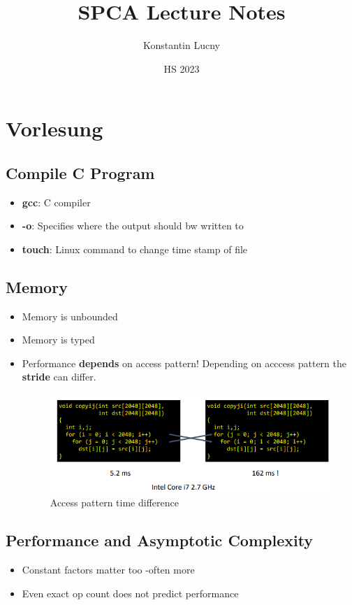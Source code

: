 \documentclass[a4paper,10pt]{article}
\title{SPCA Lecture Notes}
\author{Konstantin Lucny}
\date{HS 2023}
\begin{document}
\maketitle
\section{Vorlesung}
\subsection{Compile C Program}
\begin{itemize}
    \item \textbf{gcc}: C compiler
    \item \textbf{-o}: Specifies where the output should bw written to
    \item \textbf{touch}: Linux command to change time stamp of file
\end{itemize}
\subsection{Memory}
\begin{itemize}
    \item Memory is unbounded
    \item Memory is typed
    \item Performance \textbf{depends} on access pattern! Depending on acccess pattern the \textbf{stride} can differ. 
    \begin{figure}[htp]
    \centering
    \includegraphics[width=13cm]{e1.png}
    \caption{Access pattern time difference}
    \label{fig:example}
\end{figure}
\end{itemize}
\subsection{Performance and Asymptotic Complexity}

\begin{itemize}
    \item Constant factors matter too -often more
    \item Even exact op count does not predict performance
\end{itemize}
\end{document}
